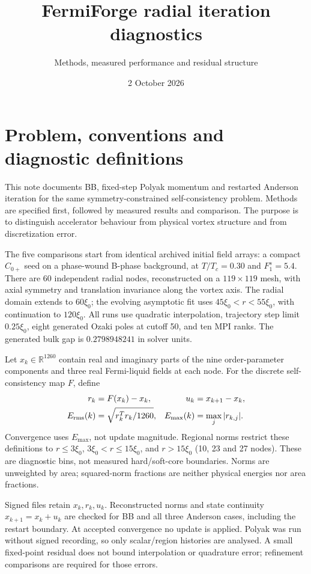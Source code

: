 \documentclass[11pt,a4paper]{article}
\title{FermiForge radial iteration diagnostics}
\author{Methods, measured performance and residual structure}
\date{2 October 2026}
\begin{document}
\maketitle
\section{Problem, conventions and diagnostic definitions}
This note documents BB, fixed-step Polyak momentum and restarted Anderson
iteration for the same symmetry-constrained self-consistency problem. Methods
are specified first, followed by measured results and comparison. The purpose
is to distinguish accelerator behaviour from physical vortex structure and
from discretization error.

The five comparisons start from identical archived initial field arrays:
a compact $C_{0+}$ seed on a phase-wound B-phase background, at $T/T_c=0.30$
and $F_1^s=5.4$. There are 60 independent radial nodes, reconstructed on a
$119\times119$ mesh, with axial symmetry and translation invariance along the
vortex axis. The radial domain extends to $60\xi_0$; the evolving asymptotic
fit uses $45\xi_0<r<55\xi_0$, with continuation to $120\xi_0$. All runs use
quadratic interpolation, trajectory step limit $0.25\xi_0$, eight generated
Ozaki poles at cutoff 50, and ten MPI ranks. The generated bulk gap is
$0.2798948241$ in solver units.

Let $x_k\in\mathbb R^{1260}$ contain real and imaginary parts of the nine
order-parameter components and three real Fermi-liquid fields at each node.
For the discrete self-consistency map $F$, define
\begin{align}
 r_k&=F(x_k)-x_k, &u_k&=x_{k+1}-x_k,\\
 E_{\rm rms}(k)&=\sqrt{r_k^Tr_k/1260}, &E_{\max}(k)&=\max_j|r_{k,j}|.
\end{align}
Convergence uses $E_{\max}$, not update magnitude. Regional norms restrict
these definitions to $r\leq3\xi_0$, $3\xi_0<r\leq15\xi_0$, and $r>15\xi_0$
(10, 23 and 27 nodes). These are diagnostic bins, not measured hard/soft-core
boundaries. Norms are unweighted by area; squared-norm fractions are neither
physical energies nor area fractions.

Signed files retain $x_k,r_k,u_k$. Reconstructed norms and state continuity
$x_{k+1}=x_k+u_k$ are checked for BB and all three Anderson cases, including the
restart boundary. At accepted convergence no update is applied. Polyak was
run without signed recording, so only scalar/region histories are analysed.
A small fixed-point residual does not bound interpolation or quadrature
error; refinement comparisons are required for those errors.
\end{document}
